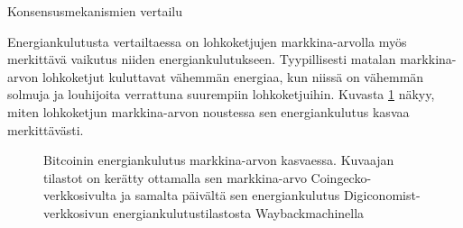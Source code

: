 \begin{chapter}{Konsensusmekanismien vertailu\label{vertailu}}
\begin{otherlanguage}{finnish}
\vspace{1cm}


Energiankulutusta vertailtaessa on lohkoketjujen markkina-arvolla myös merkittävä vaikutus niiden energiankulutukseen. Tyypillisesti matalan markkina-arvon lohkoketjut kuluttavat vähemmän energiaa, kun niissä on vähemmän solmuja ja louhijoita verrattuna suurempiin lohkoketjuihin. Kuvasta \ref{fig_energy} näkyy, miten lohkoketjun markkina-arvon noustessa sen energiankulutus kasvaa merkittävästi.

\begin{figure}[!ht]
\centering
{}
\caption{Bitcoinin energiankulutus markkina-arvon kasvaessa. Kuvaajan tilastot on kerätty ottamalla sen markkina-arvo Coingecko-verkkosivulta \cite{Coingecko} ja samalta päivältä sen energiankulutus Digiconomist-verkkosivun energiankulutustilastosta Waybackmachinella\footnotemark}
\label{fig_energy}
\end{figure}


\end{otherlanguage}
\end{chapter}

